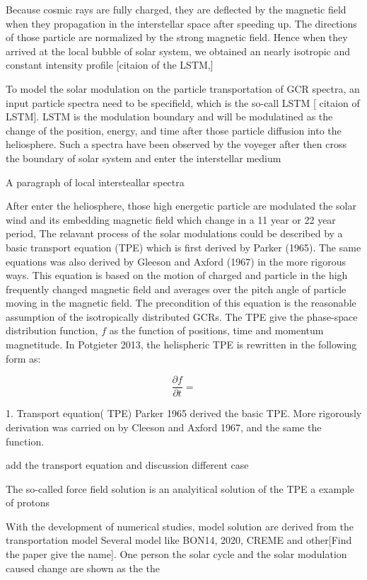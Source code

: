 Because cosmic rays are fully charged, they are deflected by the magnetic field when they propagation in the interstellar space after speeding up. The directions of those particle are normalized by the strong magnetic field. Hence when they arrived at the local bubble of solar system, we obtained an nearly isotropic and constant intensity profile [citaion of the LSTM,]


To model the solar modulation on the particle transportation of GCR spectra, an input particle spectra need to be specifield, which is the so-call LSTM [ citaion of LSTM]. LSTM is the modulation boundary and will be modulatined as the change of the position, energy, and time after those particle diffusion into the heliosphere. Such a spectra have been observed by the voyeger after then cross the boundary of solar system and enter the interstellar medium
	
A paragraph of local intersteallar spectra


After enter the heliosphere, those high energetic particle are modulated the solar wind and its embedding magnetic field  which change in a 11 year or 22 year period,
The relavant process of the solar modulations could be described by a basic transport equation (TPE) which is first derived by Parker (1965). The same equations was also derived by Gleeson and Axford (1967) in the more rigorous ways. This equation is based on the motion of charged and particle in the high frequently changed magnetic field and averages over the pitch angle of particle moving in the magnetic field. The precondition of this equation is the reasonable assumption of the isotropically distributed GCRs. The TPE give the phase-space distribution function, $f$ as the function of positions, time  and momentum magnetitude. In Potgieter 2013, the helispheric TPE is rewritten in the following form as:

\begin{equation}
	\frac{\partial f}{\partial t} = 

\end{equation}


1. Transport equation( TPE)
	 Parker 1965 derived the basic TPE. More rigorously derivation was carried on by Cleeson and Axford 1967, and the same the function.
	
	add the transport equation and discussion different case
	
    The so-called force field solution is an analyitical solution of the TPE a example of protons
    
    
    With the development of numerical studies, model solution are derived from the transportation model
    Several model like BON14, 2020, CREME and other[Find the paper give the name]. One person  
 the solar cycle and the solar modulation caused change are shown as the the 


